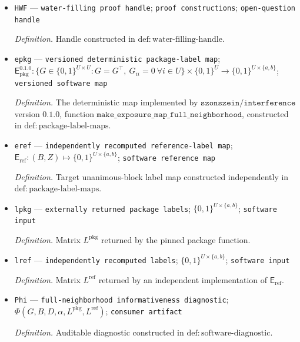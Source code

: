 \documentclass{article}
\begin{document}
\begin{itemize}
  \par\smallskip\noindent\emph{Definition.} Handle constructed in \(\mathrm{def{:}weighted\text{-}erasure\text{-}handle}\).
  \item \texttt{HWF} --- \texttt{water-\allowbreak{}filling proof handle}; \texttt{proof constructions}; \texttt{open-\allowbreak{}question handle}
  \par\smallskip\noindent\emph{Definition.} Handle constructed in \(\mathrm{def{:}water\text{-}filling\text{-}handle}\).
  \item \texttt{epkg} --- \texttt{versioned deterministic package-\allowbreak{}label map}; \(\mathsf E_{\mathrm{pkg}}^{0.1.0}:\{G\in\{0,1\}^{U\times U}:G=G^\top,\ G_{ii}=0\ \forall i\in U\}\times\{0,1\}^U\to\{0,1\}^{U\times\{a,b\}}\); \texttt{versioned software map}
  \par\smallskip\noindent\emph{Definition.} The deterministic map implemented by \(\texttt{szonszein/interference}\) version \(0.1.0\), function \(\texttt{make\_exposure\_map\_full\_neighborhood}\), constructed in \(\mathrm{def{:}package\text{-}label\text{-}maps}\).
  \item \texttt{eref} --- \texttt{independently recomputed reference-\allowbreak{}label map}; \(\mathsf E_{\mathrm{ref}}:(B,Z)\mapsto\{0,1\}^{U\times\{a,b\}}\); \texttt{software reference map}
  \par\smallskip\noindent\emph{Definition.} Target unanimous-block label map constructed independently in \(\mathrm{def{:}package\text{-}label\text{-}maps}\).
  \item \texttt{lpkg} --- \texttt{externally returned package labels}; \(\{0,1\}^{U\times\{a,b\}}\); \texttt{software input}
  \par\smallskip\noindent\emph{Definition.} Matrix \(L^{\mathrm{pkg}}\) returned by the pinned package function.
  \item \texttt{lref} --- \texttt{independently recomputed labels}; \(\{0,1\}^{U\times\{a,b\}}\); \texttt{software input}
  \par\smallskip\noindent\emph{Definition.} Matrix \(L^{\mathrm{ref}}\) returned by an independent implementation of \(\mathsf E_{\mathrm{ref}}\).
  \item \texttt{Phi} --- \texttt{full-\allowbreak{}neighborhood informativeness diagnostic}; \(\Phi(G,B,D,\alpha,L^{\mathrm{pkg}},L^{\mathrm{ref}})\); \texttt{consumer artifact}
  \par\smallskip\noindent\emph{Definition.} Auditable diagnostic constructed in \(\mathrm{def{:}software\text{-}diagnostic}\).
\end{itemize}
\end{document}
